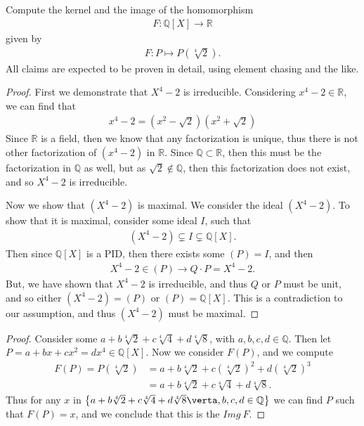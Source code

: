 \documentclass[10pt]{armath}
\newcommand{\R}{\mathbb{R}}
\newcommand{\Q}{\mathbb{Q}}
\newcommand{\ra}{\rightarrow}
\newenvironment{claim}[1]{\par\noindent\textit{Claim:}\space#1}{}
\begin{document}
\subsection{}%
\label{sub:2a}

Compute the kernel and the image of the homomorphism
\begin{align*}
  F:\Q[X]\ra\R
\end{align*}
given by
\begin{align*}
  F:P\mapsto P\left(\sqrt[4]{2}\right).
\end{align*}
All claims are expected to be proven in detail, using element chasing and the
like.

\begin{proof}
  First we demonstrate that $X^4-2$ is irreducible. Considering $x^4-2\in\R$,
  we can find that
  \begin{align*}
    x^4-2=(x^2-\sqrt{2})(x^2+\sqrt{2})
  \end{align*}
  Since $\R$ is a field, then we know that any factorization is unique, thus
  there is not other factorization of $(x^4-2)$ in $\R$. Since $\Q\subset\R$,
  then this must be the factorization in $\Q$ as well, but as
  $\sqrt{2}\notin\Q$, then this factorization does not exist, and so $X^4-2$ is
  irreducible.

  Now we show that $(X^4-2)$ is maximal. We consider the ideal $(X^4-2)$. To
  show that it is maximal, consider some ideal $I$, such that
  \begin{align*}
    (X^4-2)\subsetneq I\subsetneq \Q[X].
  \end{align*}
  Then since $\Q[X]$ is a PID, then there exists some $(P)=I$, and then
  \begin{align*}
    X^4-2\in(P)\ra Q\cdot P=X^4-2.
  \end{align*}
  But, we have shown that $X^4-2$ is irreducible, and thus $Q$ or $P$ must be
  unit, and so either $(X^4-2)=(P)$ or $(P)=\Q[X]$. This is a contradiction to
  our assumption, and thus $(X^4-2)$ must be maximal.
\end{proof}

\begin{proof}
  Consider some $a+b\sqrt[4]{2}+c\sqrt[4]{4}+d\sqrt[4]{8}$, with
  $a,b,c,d\in\Q$. Then let $P=a+bx+cx^2=dx^4\in\Q[X]$. Now we consider $F(P)$,
  and we compute
  \begin{align*}
    F(P)=P(\sqrt[4]{2})&=a+b\sqrt[4]{2}+c\left(\sqrt[4]{2}\right)^2+d\left(\sqrt[4]{2}\right)^3\\
    &=a+b\sqrt[4]{2}+c\sqrt[4]{4}+d\sqrt[4]{8}.
  \end{align*}
  Thus for any $x$ in
  $\left\{a+b\sqrt[4]{2}+c\sqrt[4]{4}+d\sqrt[4]{8}\verta,b,c,d\in\Q\right\}$
  we can find $P$ such that $F(P)=x$, and we conclude that this is the $Img\
  F$.
\end{proof}
\end{document}

